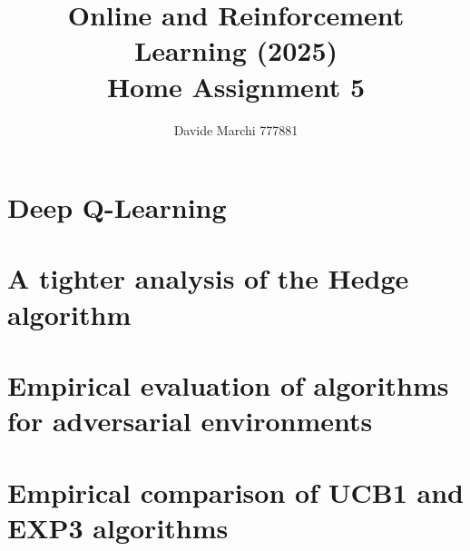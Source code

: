 \documentclass[a4paper,12pt]{article}
\begin{document}
\title{Online and Reinforcement Learning (2025)\\Home Assignment 5}
\author{\color{red}Davide Marchi 777881}
\date{}
\maketitle

\tableofcontents %
\newpage %



\section{Deep Q-Learning}


\section{A tighter analysis of the Hedge algorithm}


\section{Empirical evaluation of algorithms for adversarial environments}


\section{Empirical comparison of UCB1 and EXP3 algorithms }


    
\end{document}

